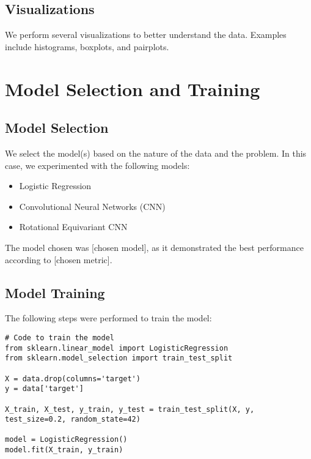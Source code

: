 \documentclass[12pt]{article}
\begin{document}
\subsection{Visualizations}
We perform several visualizations to better understand the data. Examples include histograms, boxplots, and pairplots.


\section{Model Selection and Training}

\subsection{Model Selection}
We select the model(s) based on the nature of the data and the problem. In this case, we experimented with the following models:

\begin{itemize}
    \item Logistic Regression
    \item Convolutional Neural Networks (CNN)
    \item Rotational Equivariant CNN
\end{itemize}

The model chosen was [chosen model], as it demonstrated the best performance according to [chosen metric].

\subsection{Model Training}
The following steps were performed to train the model:

\begin{verbatim}
# Code to train the model
from sklearn.linear_model import LogisticRegression
from sklearn.model_selection import train_test_split

X = data.drop(columns='target')
y = data['target']

X_train, X_test, y_train, y_test = train_test_split(X, y, test_size=0.2, random_state=42)

model = LogisticRegression()
model.fit(X_train, y_train)
\end{verbatim}
\end{document}
